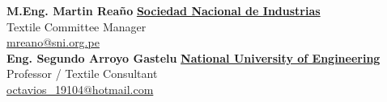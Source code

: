 \documentclass[10pt]{article}
\begin{document}
\textbf{M.Eng. Martin Reaño}
\hfill \href{http://www.sni.org.pe/}{\textbf{Sociedad Nacional de Industrias}}\\
Textile Committee Manager\\ 
\href{mailto:mreano@sni.org.pe}{mreano@sni.org.pe}\\

\textbf{Eng. Segundo Arroyo Gastelu}
\hfill \href{http://www.uni.edu.pe}{\textbf{National University of Engineering}}\\
Professor / Textile Consultant\\
\href{mailto:octavios_1904@hotmail.com}{octavios\_19104@hotmail.com}\\
\end{document}
